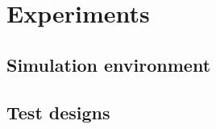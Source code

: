 \chapter{Experiments}
\label{maintwo}

\section{Simulation environment}


\section{Test designs}



\section{}